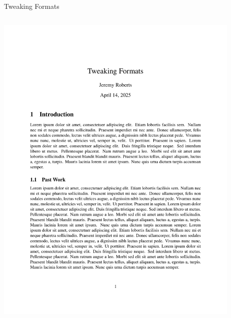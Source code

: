 \documentclass[aspectratio=1610]{beamer}
\begin{document}
\begin{frame}[fragile]{Tweaking Formats}
  \begin{columns}[T]


      


      \includegraphics[width=0.9\textwidth, frame]{example_formatting.pdf}

  \end{columns}
\end{frame}
\end{document}
